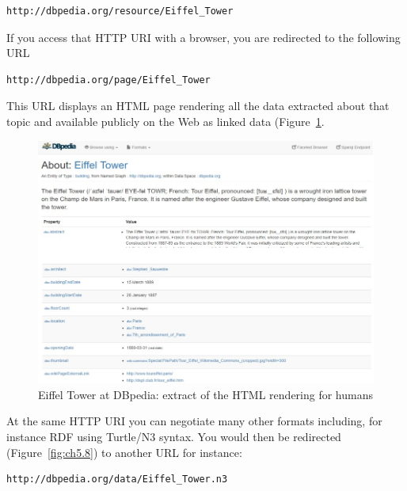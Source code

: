\begin{lstlisting}
http://dbpedia.org/resource/Eiffel_Tower
\end{lstlisting}

If you access that HTTP URI with a browser, you are redirected to the
following URL

\begin{lstlisting}
http://dbpedia.org/page/Eiffel_Tower
\end{lstlisting}

This URL displays an HTML page rendering all the data extracted about
that topic and available publicly on the Web as linked data (Figure~\ref{fig:ch5.7}.

\begin{figure}
    \centering
    \includegraphics[width=5in]{media/ch5/figure-05-07.jpg}
    \caption{Eiffel Tower at DBpedia: extract of the HTML rendering for humans}
    \label{fig:ch5.7}
\end{figure}

At the same HTTP URI you can negotiate many other formats including, for
instance RDF using Turtle/N3 syntax. You would then be redirected
(Figure~\ref{fig:ch5.8}) to another URL for instance:

\begin{lstlisting}
http://dbpedia.org/data/Eiffel_Tower.n3
\end{lstlisting}



